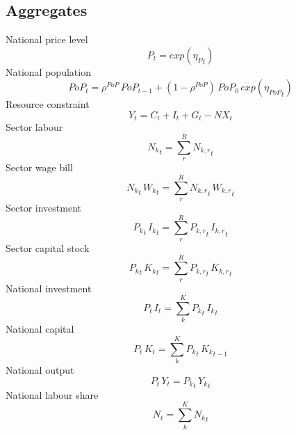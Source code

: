 \subsection{Aggregates}
National price level
\begin{dmath}
{P_{t}}=exp\left({{\eta_{P}}_{t}}\right)
\end{dmath}
National population
\begin{dmath}
{PoP_{t}}={{\rho^{PoP}}}\, {PoP_{t-1}}+\left(1-{{\rho^{PoP}}}\right)\, {{PoP_0}}\, exp\left({{\eta_{PoP}}_{t}}\right)
\end{dmath}
Resource constraint
\begin{dmath}
{Y_{t}}={C_{t}}+{I_{t}}+{G_{t}}-{NX_{t}}
\end{dmath}
Sector labour
\begin{dmath}
{{N_k}_{t}}={\sum_{r}^{R} {N_{k,r}}_{t}}
\end{dmath}
Sector wage bill
\begin{dmath}
{{N_k}_{t}}\, {{W_k}_{t}}={\sum_{r}^{R} {N_{k,r}}_{t}}\, {{W_{k,r}}_{t}}
\end{dmath}
Sector investment
\begin{dmath}
{{P_k}_{t}}\, {{I_k}_{t}}={\sum_{r}^{R} {P_{k,r}}_{t}}\, {{I_{k,r}}_{t}}
\end{dmath}
Sector capital stock
\begin{dmath}
{{P_k}_{t}}\, {{K_k}_{t}}={\sum_{r}^{R} {P_{k,r}}_{t}}\, {{K_{k,r}}_{t}}
\end{dmath}
National investment
\begin{dmath}
{P_{t}}\, {I_{t}}={\sum_{k}^{K} {P_k}_{t}}\, {{I_k}_{t}}
\end{dmath}
National capital
\begin{dmath}
{P_{t}}\, {K_{t}}={\sum_{k}^{K} {P_k}_{t}}\, {{K_k}_{t-1}}
\end{dmath}
National output
\begin{dmath}
{P_{t}}\, {Y_{t}}={{P_k}_{t}}\, {{Y_k}_{t}}
\end{dmath}
National labour share
\begin{dmath}
{N_{t}}={\sum_{k}^{K} {N_k}_{t}}
\end{dmath}